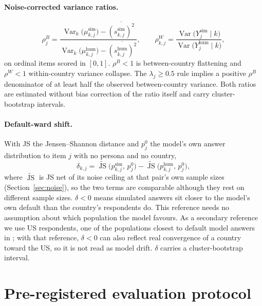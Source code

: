 \documentclass[10pt]{article}
\begin{document}
\paragraph{Noise-corrected variance ratios.}
\begin{equation}
\rho^{B}_j = \frac{\operatorname{Var}_k\big(\mu^{\text{sim}}_{k,j}\big) - \overline{(s^{\text{sim}}_{k,j})^2}}{\operatorname{Var}_k\big(\mu^{\text{hum}}_{k,j}\big) - \overline{(s^{\text{hum}}_{k,j})^2}},\qquad
\rho^{W}_{k,j} = \frac{\operatorname{Var}\big(Y^{\text{sim}}_{j}\mid k\big)}{\operatorname{Var}\big(Y^{\text{hum}}_{j}\mid k\big)},
\end{equation}
on ordinal items scored in $[0,1]$. $\rho^B<1$ is between-country flattening and $\rho^W<1$ within-country variance collapse. The $\lambda_j \ge 0.5$ rule implies a positive $\rho^B$ denominator of at least half the observed between-country variance. Both ratios are estimated without bias correction of the ratio itself and carry cluster-bootstrap intervals.

\paragraph{Default-ward shift.} With JS the Jensen--Shannon distance and $p^{0}_j$ the model's own answer distribution to item $j$ with no persona and no country,
\begin{equation}
\delta_{k,j} = \widetilde{\operatorname{JS}}\big(p^{\text{sim}}_{k,j},\,p^{0}_j\big) - \widetilde{\operatorname{JS}}\big(p^{\text{hum}}_{k,j},\,p^{0}_j\big),
\end{equation}
where $\widetilde{\operatorname{JS}}$ is JS net of its noise ceiling at that pair's own sample sizes (Section~\ref{sec:noise}), so the two terms are comparable although they rest on different sample sizes. $\delta<0$ means simulated answers sit closer to the model's own default than the country's respondents do. This reference needs no assumption about which population the model favours. As a secondary reference we use US respondents, one of the populations closest to default model answers in \citet{durmus2023}; with that reference, $\delta<0$ can also reflect real convergence of a country toward the US, so it is not read as model drift. $\delta$ carries a cluster-bootstrap interval.

\section{Pre-registered evaluation protocol}
\label{sec:protocol}
\end{document}
